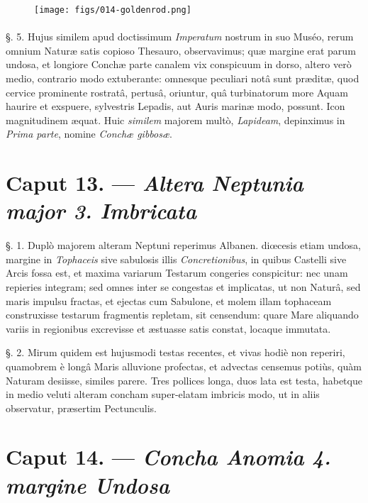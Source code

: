 \documentclass[a4paper, 11pt, oneside, polutonikogreek, german]{article}
\begin{document}
\begin{figure}[H]
\centering
\texttt{[image: figs/014-goldenrod.png]}

\end{figure}
\paragraph{}
§. 5. Hujus similem apud doctissimum \emph{Imperatum} nostrum in suo Muséo, rerum omnium Naturæ satis copioso Thesauro, observavimus; quæ margine erat parum undosa, et longiore Conchæ parte canalem vix conspicuum in dorso, altero verò medio, contrario modo extuberante: omnesque peculiari notâ sunt præditæ, quod cervice prominente rostratâ, pertusâ, oriuntur, quâ turbinatorum more Aquam haurire et exspuere, sylvestris Lepadis, aut Auris marinæ modo, possunt. Icon magnitudinem æquat. Huic \emph{similem} majorem multò, \emph{Lapideam}, depinximus in \emph{Prima parte}, nomine \emph{Conchæ gibbosæ}.

\section{Caput 13. --- \emph{Altera Neptunia major 3. Imbricata}}
\paragraph{}
§. 1. Duplò majorem alteram Neptuni reperimus Albanen. diœcesis etiam undosa, margine in \emph{Tophaceis} sive sabulosis illis \emph{Concretionibus}, in quibus Castelli sive Arcis fossa est, et maxima variarum Testarum congeries conspicitur: nec unam repieries integram; sed omnes inter se congestas et implicatas, ut non Naturâ, sed maris impulsu fractas, et ejectas cum Sabulone, et molem illam tophaceam construxisse testarum fragmentis repletam, sit censendum: quare Mare aliquando variis in regionibus excrevisse et æstuasse satis constat, locaque immutata.

§. 2. Mirum quidem est hujusmodi testas recentes, et vivas hodiè non reperiri, quamobrem è longâ Maris alluvione profectas, et advectas censemus potiùs, quàm Naturam desiisse, similes parere. Tres pollices longa, duos lata est testa, habetque in medio veluti alteram concham super-elatam imbricis modo, ut in aliis observatur, præsertim Pectunculis.

\section{Caput 14. --- \emph{Concha Anomia 4. margine Undosa}}
\end{document}
